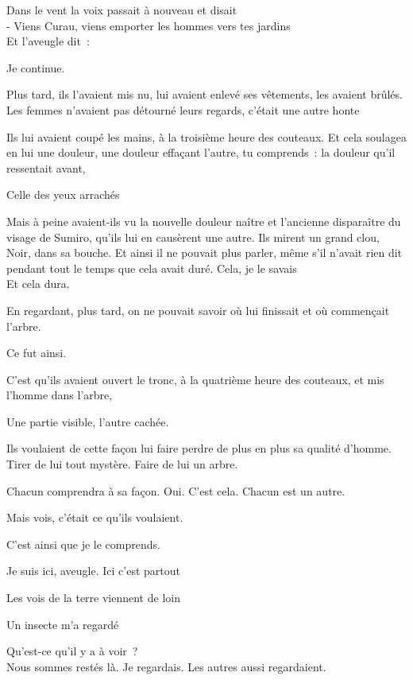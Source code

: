 Dans le vent la voix passait à nouveau et disait\\

- Viens Curau, viens emporter les hommes vers tes jardins\\

Et l'aveugle dit~:

Je continue.

Plus tard, ils l'avaient mis nu, lui avaient enlevé ses vêtements, les
avaient brûlés. Les femmes n'avaient pas détourné leurs regards, c'était
une autre honte

Ils lui avaient coupé les mains, à la troisième heure des couteaux. Et
cela soulagea en lui une douleur, une douleur effaçant l'autre, tu
comprends~: la douleur qu'il ressentait avant,

Celle des yeux arrachés

Mais à peine avaient-ils vu la nouvelle douleur naître et l'ancienne
disparaître du visage de Sumiro, qu'ils lui en causèrent une autre. Ils
mirent un grand clou, Noir, dans sa bouche. Et ainsi il ne pouvait plus
parler, même s'il n'avait rien dit pendant tout le temps que cela avait
duré. Cela, je le savais\\

Et cela dura.

En regardant, plus tard, on ne pouvait savoir où lui finissait et où
commençait l'arbre.

Ce fut ainsi.

C'est qu'ils avaient ouvert le tronc, à la quatrième heure des couteaux,
et mis l'homme dans l'arbre,

Une partie visible, l'autre cachée.

Ils voulaient de cette façon lui faire perdre de plus en plus sa qualité
d'homme. Tirer de lui tout mystère. Faire de lui un arbre.

Chacun comprendra à sa façon. Oui. C'est cela. Chacun est un autre.

Mais vois, c'était ce qu'ils voulaient.

C'est ainsi que je le comprends.

Je suis ici, aveugle. Ici c'est partout

Les vois de la terre viennent de loin

Un insecte m'a regardé

Qu'est-ce qu'il y a à voir~?\\

Nous sommes restés là. Je regardais. Les autres aussi regardaient.

